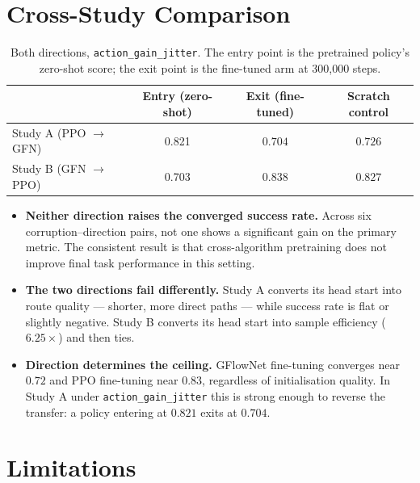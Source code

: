\clearpage
\section{Cross-Study Comparison}

\begin{table}[htbp]
\centering
\setlength{\tabcolsep}{4pt}
\caption{Both directions, \texttt{action\_gain\_jitter}. The entry point is the
pretrained policy's zero-shot score; the exit point is the fine-tuned arm at
300,000 steps.}
\small
\begin{tabular}{lccc}
\toprule
 & Entry (zero-shot) & Exit (fine-tuned) & Scratch control \\
\midrule
Study A (PPO $\rightarrow$ GFN) & 0.821 & $0.704$ & $0.726$ \\
Study B (GFN $\rightarrow$ PPO) & 0.703 & $0.838$ & $0.827$ \\
\bottomrule
\end{tabular}
\end{table}

\begin{itemize}
  \item \textbf{Neither direction raises the converged success rate.} Across six corruption--direction pairs, not one shows a significant gain on the primary metric. The consistent result is that cross-algorithm pretraining does not improve final task performance in this setting.
  \item \textbf{The two directions fail differently.} Study A converts its head start into route quality --- shorter, more direct paths --- while success rate is flat or slightly negative. Study B converts its head start into sample efficiency ($6.25\times$) and then ties.
  \item \textbf{Direction determines the ceiling.} GFlowNet fine-tuning converges near $0.72$ and PPO fine-tuning near $0.83$, regardless of initialisation quality. In Study A under \texttt{action\_gain\_jitter} this is strong enough to reverse the transfer: a policy entering at $0.821$ exits at $0.704$.
\end{itemize}

\section{Limitations}

